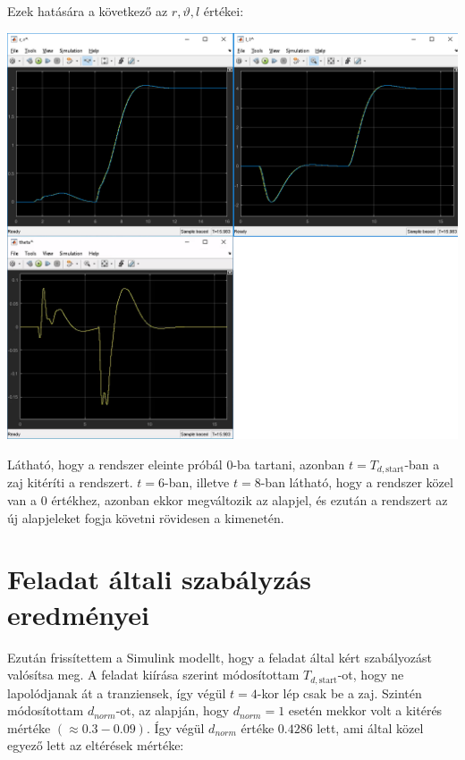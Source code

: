 \documentclass{article}
\begin{document}
    Ezek hatására a következő az $r, \vartheta, l$ értékei:
    \begin{center}
        \includegraphics[width=\linewidth]{asset/result.png}
    \end{center}
    Látható, hogy a rendszer eleinte próbál 0-ba tartani, azonban $t = T_{d,\textrm{start}}$-ban a zaj kitéríti a rendszert. $t = 6$-ban, illetve $t = 8$-ban látható, hogy a rendszer közel van a 0 értékhez, azonban ekkor megváltozik az alapjel, és ezután a rendszert az új alapjeleket fogja követni rövidesen a kimenetén.

\section{Feladat általi szabályzás eredményei}
    Ezután frissítettem a Simulink modellt, hogy a feladat által kért szabályozást valósítsa meg. A feladat kiírása szerint módosítottam $T_{d, \textrm{start}}$-ot, hogy ne lapolódjanak át a tranziensek, így végül $t = 4$-kor lép csak be a zaj. Szintén módosítottam $d_{norm}$-ot, az alapján, hogy $d_{norm} = 1$ esetén mekkor volt a kitérés mértéke $(\approx0.3 - 0.09)$. Így végül $d_{norm}$ értéke $0.4286$ lett, ami által közel egyező lett az eltérések mértéke:
\end{document}
